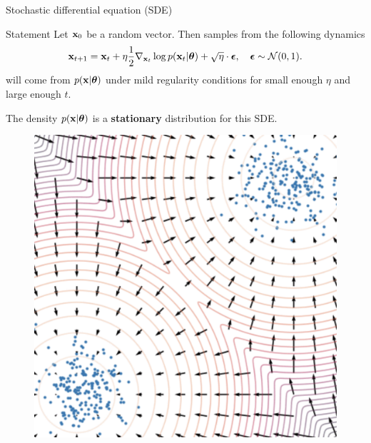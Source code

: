 \begin{frame}{Stochastic differential equation (SDE)}
	\begin{block}{Statement}
		Let $\mathbf{x}_0$ be a random vector. Then samples from the following dynamics
		\[
			\mathbf{x}_{t + 1} = \mathbf{x}_t + \eta \frac{1}{2} \nabla_{\mathbf{x}_t} \log p(\mathbf{x}_t | \boldsymbol{\theta}) + \sqrt{\eta} \cdot \boldsymbol{\epsilon}, \quad \boldsymbol{\epsilon} \sim \mathcal{N}(0, 1).
		\]
		will come from $p(\mathbf{x} | \boldsymbol{\theta})$ under mild regularity conditions for small enough $\eta$ and large enough $t$.
	\end{block}
	\begin{minipage}{0.6\linewidth}
		The density $p(\mathbf{x} | \boldsymbol{\theta})$ is a \textbf{stationary} distribution for this SDE.
	\end{minipage}%
	\begin{minipage}{0.35\linewidth}
		\vspace{-0.2cm}
		\begin{figure}
			\centering
			\includegraphics[width=0.9\linewidth]{figs/langevin_dynamic}
		\end{figure}
	\end{minipage}
	\end{frame}
